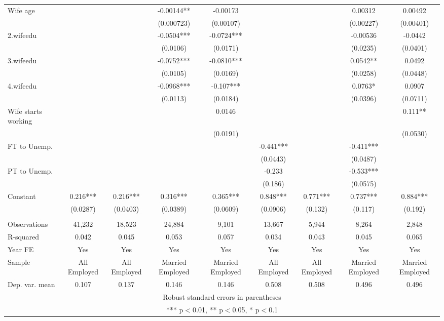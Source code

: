 \begin{tabular}{lcccccccc}
Wife age &  &  & -0.00144** & -0.00173 &  &  & 0.00312 & 0.00492 \\
 &  &  & (0.000723) & (0.00107) &  &  & (0.00227) & (0.00401) \\
2.wifeedu &  &  & -0.0504*** & -0.0724*** &  &  & -0.00536 & -0.0442 \\
 &  &  & (0.0106) & (0.0171) &  &  & (0.0235) & (0.0401) \\
3.wifeedu &  &  & -0.0752*** & -0.0810*** &  &  & 0.0542** & 0.0492 \\
 &  &  & (0.0105) & (0.0169) &  &  & (0.0258) & (0.0448) \\
4.wifeedu &  &  & -0.0968*** & -0.107*** &  &  & 0.0763* & 0.0907 \\
 &  &  & (0.0113) & (0.0184) &  &  & (0.0396) & (0.0711) \\
Wife starts working &  &  &  & 0.0146 &  &  &  & 0.111** \\
 &  &  &  & (0.0191) &  &  &  & (0.0530) \\
FT to Unemp. &  &  &  &  & -0.441*** &  & -0.411*** &  \\
 &  &  &  &  & (0.0443) &  & (0.0487) &  \\
PT to Unemp. &  &  &  &  & -0.233 &  & -0.533*** &  \\
 &  &  &  &  & (0.186) &  & (0.0575) &  \\
Constant & 0.216*** & 0.216*** & 0.316*** & 0.365*** & 0.848*** & 0.771*** & 0.737*** & 0.884*** \\
 & (0.0287) & (0.0403) & (0.0389) & (0.0609) & (0.0906) & (0.132) & (0.117) & (0.192) \\
 &  &  &  &  &  &  &  &  \\
Observations & 41,232 & 18,523 & 24,884 & 9,101 & 13,667 & 5,944 & 8,264 & 2,848 \\
R-squared & 0.042 & 0.045 & 0.053 & 0.057 & 0.034 & 0.043 & 0.045 & 0.065 \\
Year FE & Yes & Yes & Yes & Yes & Yes & Yes & Yes & Yes \\
Sample & All Employed & All Employed & Married Employed & Married Employed & All Employed & All Employed & Married Employed & Married Employed \\
 Dep. var. mean & 0.107 & 0.137 & 0.146 & 0.146 & 0.508 & 0.508 & 0.496 & 0.496 \\ \hline
\multicolumn{9}{c}{ Robust standard errors in parentheses} \\
\multicolumn{9}{c}{ *** p$<$0.01, ** p$<$0.05, * p$<$0.1} \\
\end{tabular}
